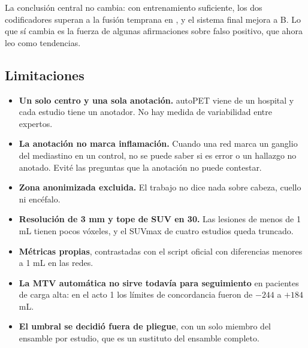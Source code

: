 La conclusión central no cambia: con entrenamiento suficiente, los dos codificadores superan a la fusión temprana en \dmas{}, y el sistema final mejora a B. Lo que sí cambia es la fuerza de algunas afirmaciones sobre falso positivo, que ahora leo como tendencias.

\subsection{Limitaciones}

\begin{itemize}
\item \textbf{Un solo centro y una sola anotación.} autoPET viene de un hospital y cada estudio tiene un anotador. No hay medida de variabilidad entre expertos.
\item \textbf{La anotación no marca inflamación.} Cuando una red marca un ganglio del mediastino en un control, no se puede saber si es error o un hallazgo no anotado. Evité las preguntas que la anotación no puede contestar.
\item \textbf{Zona anonimizada excluida.} El trabajo no dice nada sobre cabeza, cuello ni encéfalo.
\item \textbf{Resolución de 3 mm y tope de SUV en 30.} Las lesiones de menos de 1 mL tienen pocos vóxeles, y el SUVmax de cuatro estudios queda truncado.
\item \textbf{Métricas propias}, contrastadas con el script oficial con diferencias menores a 1 mL en las redes.
\item \textbf{La MTV automática no sirve todavía para seguimiento} en pacientes de carga alta: en el acto 1 los límites de concordancia fueron de $-244$ a $+184$ mL.
\item \textbf{El umbral se decidió fuera de pliegue}, con un solo miembro del ensamble por estudio, que es un sustituto del ensamble completo.
\end{itemize}
